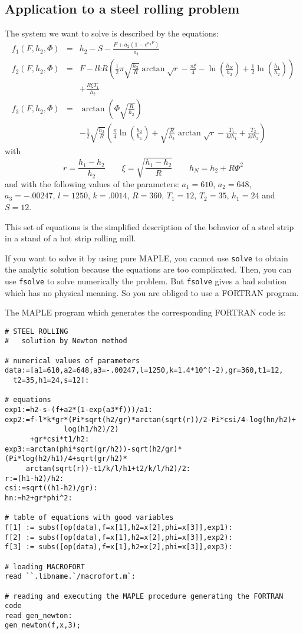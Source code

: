 \subsection{Application to a steel rolling problem}

The system we want to solve is described by the equations:
\begin{eqnarray*}
 f_1(F,h_2,\Phi)& = & h_2-S-\frac{F+a_2(1-e^{a_3 F})}{a_1} \\
 f_2(F,h_2,\Phi)& = & F-l k R 
   \left(\frac{1}{2} \pi \sqrt{\frac{h_2}{R}}\arctan\sqrt{r}
     -\frac{\pi\xi}{4}-\ln\left(\frac{h_N}{h_2}\right)
     +\frac{1}{2}\ln\left(\frac{h_1}{h_2}\right)\right) \\
 & & +\frac{R \xi T_1}{h_2} \\
 f_3(F,h_2,\Phi)& = & \arctan\left(\Phi\sqrt{\frac{R}{h_2}}\right) \\
 & & -\frac{1}{2}\sqrt{\frac{h_2}R}
       \left(\frac{\pi}4 \ln\left(\frac{h_2}{h_1}\right)
         +\sqrt{\frac{R}{h_2}} \arctan\sqrt{r}-\frac{T_1}{k l h_1}
         +\frac{T_2}{k l h_2}\right)
\end{eqnarray*}
with
\[
 r=\frac{h_1-h_2}{h_2} \qquad
 \xi=\sqrt{\frac{h_1-h_2}R} \qquad
 h_N=h_2+R\Phi^2
\]
and with the following values of the parameters:
$a_1=610$, $a_2=648$, $a_3=-.00247$, $l=1250$, $k=.0014$, $R=360$,
$T_1=12$, $T_2=35$, $h_1=24$ and $S=12$.

This set of equations is the simplified description of the behavior 
of a steel strip
in a stand of a hot strip rolling mill.

If you want to solve it by using pure MAPLE, you cannot use {\tt solve} to
obtain the analytic solution because the equations are too complicated.
Then, you can use {\tt fsolve} to solve numerically the problem. But
{\tt fsolve} gives a bad solution which has no physical meaning. So you
are obliged to use a FORTRAN program.

\medskip
The MAPLE program which generates the corresponding FORTRAN code is:
\begin{verbatim}
# STEEL ROLLING
#   solution by Newton method

# numerical values of parameters
data:=[a1=610,a2=648,a3=-.00247,l=1250,k=1.4*10^(-2),gr=360,t1=12,
  t2=35,h1=24,s=12]:

# equations
exp1:=h2-s-(f+a2*(1-exp(a3*f)))/a1:
exp2:=f-l*k*gr*(Pi*sqrt(h2/gr)*arctan(sqrt(r))/2-Pi*csi/4-log(hn/h2)+
              log(h1/h2)/2)
      +gr*csi*t1/h2:
exp3:=arctan(phi*sqrt(gr/h2))-sqrt(h2/gr)*(Pi*log(h2/h1)/4+sqrt(gr/h2)*
     arctan(sqrt(r))-t1/k/l/h1+t2/k/l/h2)/2:
r:=(h1-h2)/h2:
csi:=sqrt((h1-h2)/gr):
hn:=h2+gr*phi^2:

# table of equations with good variables
f[1] := subs([op(data),f=x[1],h2=x[2],phi=x[3]],exp1):
f[2] := subs([op(data),f=x[1],h2=x[2],phi=x[3]],exp2): 
f[3] := subs([op(data),f=x[1],h2=x[2],phi=x[3]],exp3):

# loading MACROFORT
read ``.libname.`/macrofort.m`:

# reading and executing the MAPLE procedure generating the FORTRAN code
read gen_newton:
gen_newton(f,x,3);
\end{verbatim}

